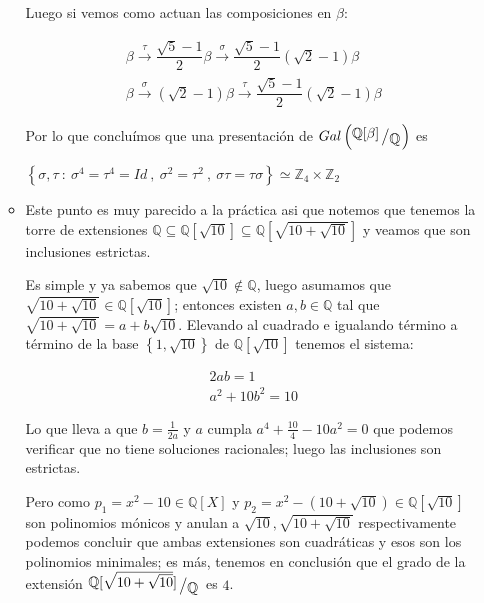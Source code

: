 \documentclass[11pt]{article}
\newcommand{\Q}{\mathbb{Q}}
\newcommand{\Z}{\mathbb{Z}}
\newcommand\tq{~:~}
\newcommand{\sett}[1]{\left\lbrace#1\right\rbrace}
\newcommand{\quotient}[2]{{\raisebox{.2em}{$#1$}\left/\raisebox{-.2em}{$#2$}\right.}}
\numberwithin{theorem}{subsection}
\begin{document}
\begin{enumerate}
\begin{itemize}
		Luego si vemos como actuan las composiciones en $\beta$:
		
		\begin{equation*}
			\begin{aligned}
				\beta \xrightarrow{\tau} \dfrac{\sqrt{5} - 1}{2} \beta \xrightarrow{\sigma} \dfrac{\sqrt{5} - 1}{2}\left(\sqrt{2} - 1\right)\beta \\
				\beta \xrightarrow{\sigma} \left(\sqrt{2} - 1\right)\beta \xrightarrow{\tau} \dfrac{\sqrt{5} - 1}{2}\left(\sqrt{2} - 1\right)\beta 
			\end{aligned}
		\end{equation*}
		
		Por lo que conclu\'imos que una presentaci\'on de $Gal\left(\quotient{\Q[\beta]}{\Q}\right)$ es
		
		 $\sett{\sigma, \tau \tq \sigma^4 = \tau^4 = Id \ , \ \sigma^2 = \tau^2 \ , \ \sigma\tau = \tau\sigma } \simeq \Z_4 \times \Z_2$
		
		\item Este punto es muy parecido a la pr\'actica asi que notemos que tenemos la torre de extensiones $\Q \subseteq \Q[\sqrt{10}] \subseteq \Q[\sqrt{10 + \sqrt{10}}]$ y veamos que son inclusiones estrictas.
		
		Es simple y ya sabemos que $\sqrt{10} \not \in \Q$, luego asumamos que $\sqrt{10 + \sqrt{10}} \in \Q[\sqrt{10}] $; entonces existen $a,b \in \Q$ tal que $\sqrt{10 + \sqrt{10}} = a + b \sqrt{10}$. Elevando al cuadrado e igualando t\'ermino a t\'ermino de la base $\sett{1, \sqrt{10}}$ de $\Q[\sqrt{10}]$ tenemos el sistema:
		
		\begin{equation*}
			\begin{aligned}
				2ab = 1 \\
				a^2 + 10b^2 = 10
			\end{aligned}
		\end{equation*}
		
		Lo que lleva a que $b = \frac{1}{2a}$ y $a$ cumpla $a^4 + \frac{10}{4}-10a^2 =0$ que podemos verificar que no tiene soluciones racionales; luego las inclusiones son estrictas.
		
		Pero como $p_1 = x^2 - 10 \in \Q[X]$ y $p_2 = x^2 - \left(10 + \sqrt{10}\right) \in \Q[\sqrt{10}]$ son polinomios m\'onicos y anulan a $\sqrt{10}, \sqrt{10+\sqrt{10}}$ respectivamente podemos concluir que ambas extensiones son cuadr\'aticas y esos son los polinomios minimales; es m\'as, tenemos en conclusi\'on que el grado de la extensi\'on $\quotient{\Q[\sqrt{10 + \sqrt{10}}]}{\Q}$ es $4$.
		

\end{itemize}
\end{enumerate}
\end{document}

